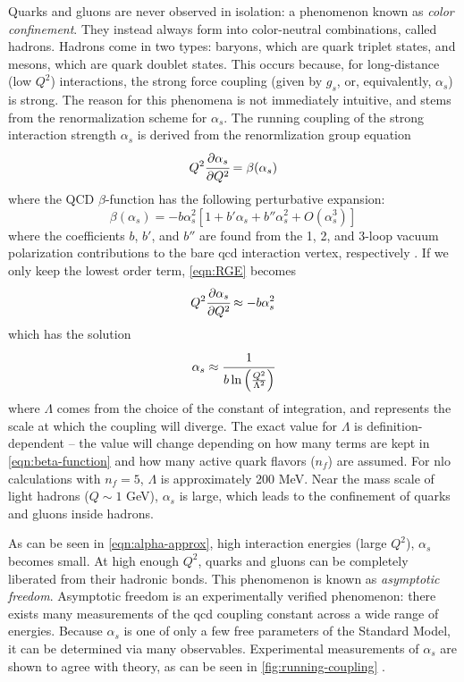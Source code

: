 Quarks and gluons are never observed in isolation: a phenomenon known as \textit{color confinement}.
They instead always form into color-neutral combinations, called hadrons.
Hadrons come in two types: baryons, which are quark triplet states, and mesons, which are quark doublet states.
This occurs because, for long-distance (low $Q^2$) interactions, the strong force coupling (given by $g_s$, or, equivalently, $\alpha_s$) is strong.
The reason for this phenomena is not immediately intuitive, and stems from the renormalization scheme for $\alpha_s$.
The running coupling of the strong interaction strength $\alpha_s$ is derived from the renormlization group equation
\begin{equation}
  \label{eqn:RGE}
  Q^2 \cfrac{\partial \alpha_s}{\partial Q^2} = \beta(\alpha_s)
\end{equation}
where the QCD $\beta$-function has the following perturbative expansion:
\begin{equation}
  \label{eqn:beta-function}
  \beta(\alpha_s) = -b \alpha_s^2 \left[1 + b'\alpha_s + b''\alpha_s^2  + O(\alpha_s^3)\right]
\end{equation}
where the coefficients $b$, $b'$, and $b''$ are found from the 1, 2, and 3-loop vacuum polarization contributions to the bare \gls{qcd} interaction vertex, respectively \cite{Ellis_Stirling_Webber_1996}.
If we only keep the lowest order term, \ref{eqn:RGE} becomes
\begin{equation}
  \label{eqn:RGE-lowest-order}
  Q^2 \cfrac{\partial \alpha_s}{\partial Q^2} \approx -b \alpha_s^2
\end{equation}
which has the solution
\begin{equation}
  \label{eqn:alpha-approx}
  \alpha_s \approx \cfrac{1}{b\ln\left(\frac{Q^2}{\Lambda^2}\right)}
\end{equation}
where $\Lambda$ comes from the choice of the constant of integration, and represents the scale at which the coupling will diverge.
The exact value for $\Lambda$ is definition-dependent -- the value will change depending on how many terms are kept in \ref{eqn:beta-function} and how many active quark flavors ($n_f$) are assumed.
For \gls{nlo} calculations with $n_f = 5$, $\Lambda$ is approximately 200 MeV.
Near the mass scale of light hadrons ($Q \sim 1$ GeV), $\alpha_s$ is large, which leads to the confinement of quarks and gluons inside hadrons.

As can be seen in \ref{eqn:alpha-approx}, high interaction energies (large $Q^2$), $\alpha_s$ becomes small.
At high enough $Q^2$, quarks and gluons can be completely liberated from their hadronic bonds.
This phenomenon is known as \textit{asymptotic freedom}.
Asymptotic freedom is an experimentally verified phenomenon: there exists many measurements of the \gls{qcd} coupling constant across a wide range of energies.
Because $\alpha_s$ is one of only a few free parameters of the Standard Model, it can be determined via many observables.
Experimental measurements of $\alpha_s$ are shown to agree with theory, as can be seen in \ref{fig:running-coupling} \cite{ParticleDataGroup:2024cfk}.











